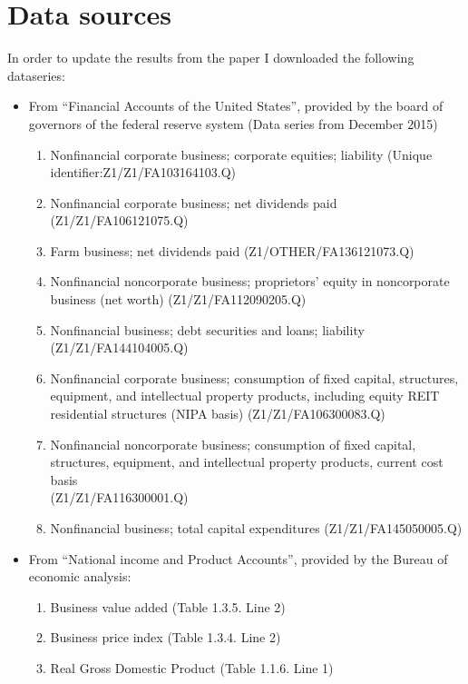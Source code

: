 \section{Data sources}
\label{sub:data_sources}

In order to update the results from the paper I downloaded the following
dataseries:
\begin{itemize}
\item From ``Financial Accounts of the United States'', provided by the board
  of governors of the federal reserve system (Data series from December 2015)
  \begin{enumerate}
  \item Nonfinancial corporate business; corporate equities; liability (Unique
    identifier:Z1/Z1/FA103164103.Q)
  \item Nonfinancial corporate business; net dividends paid
    (Z1/Z1/FA106121075.Q)
  \item Farm business; net dividends paid (Z1/OTHER/FA136121073.Q)
  \item Nonfinancial noncorporate business; proprietors' equity in noncorporate
    business (net worth) (Z1/Z1/FA112090205.Q)
  \item Nonfinancial business; debt securities and loans; liability\\
    (Z1/Z1/FA144104005.Q)
  \item Nonfinancial corporate business; consumption of fixed capital,
    structures, equipment, and intellectual property products, including equity
    REIT residential structures (NIPA basis) (Z1/Z1/FA106300083.Q)
  \item Nonfinancial noncorporate business; consumption of fixed capital,
    structures, equipment, and intellectual property products, current cost
    basis\\
    (Z1/Z1/FA116300001.Q)
  \item Nonfinancial business; total capital expenditures (Z1/Z1/FA145050005.Q)
  \end{enumerate}
\item From ``National income and Product Accounts'', provided by the Bureau of
  economic analysis:
  \begin{enumerate}
  \item Business value added (Table 1.3.5. Line 2)
  \item Business price index (Table 1.3.4. Line 2)
  \item Real Gross Domestic Product (Table 1.1.6. Line 1)
  \end{enumerate}

\end{itemize}
